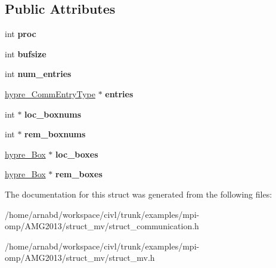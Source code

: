 \subsection*{Public Attributes}
\begin{DoxyCompactItemize}
\item 
\hypertarget{structhypre__CommType__struct_afdc82d23d1051008a87fb58c103ba71b}{}int {\bfseries proc}\label{structhypre__CommType__struct_afdc82d23d1051008a87fb58c103ba71b}

\item 
\hypertarget{structhypre__CommType__struct_a861196212b6c58c29f6d6f4698cb4307}{}int {\bfseries bufsize}\label{structhypre__CommType__struct_a861196212b6c58c29f6d6f4698cb4307}

\item 
\hypertarget{structhypre__CommType__struct_a4b16b6d60f50e7b8cc4e13e408817066}{}int {\bfseries num\+\_\+entries}\label{structhypre__CommType__struct_a4b16b6d60f50e7b8cc4e13e408817066}

\item 
\hypertarget{structhypre__CommType__struct_a0c63140c8f8e06f286b87d7103e606bd}{}\hyperlink{structhypre__CommEntryType__struct}{hypre\+\_\+\+Comm\+Entry\+Type} $\ast$ {\bfseries entries}\label{structhypre__CommType__struct_a0c63140c8f8e06f286b87d7103e606bd}

\item 
\hypertarget{structhypre__CommType__struct_a3bd55bd73f4481ab3d7a4941df0efaf9}{}int $\ast$ {\bfseries loc\+\_\+boxnums}\label{structhypre__CommType__struct_a3bd55bd73f4481ab3d7a4941df0efaf9}

\item 
\hypertarget{structhypre__CommType__struct_aaacbcf897f18fced423c429ff10ca0d4}{}int $\ast$ {\bfseries rem\+\_\+boxnums}\label{structhypre__CommType__struct_aaacbcf897f18fced423c429ff10ca0d4}

\item 
\hypertarget{structhypre__CommType__struct_a2e78a1becf4d42d915aabb4a757c03e5}{}\hyperlink{structhypre__Box__struct}{hypre\+\_\+\+Box} $\ast$ {\bfseries loc\+\_\+boxes}\label{structhypre__CommType__struct_a2e78a1becf4d42d915aabb4a757c03e5}

\item 
\hypertarget{structhypre__CommType__struct_afd922d7b0978d517963c0a5a05f4242b}{}\hyperlink{structhypre__Box__struct}{hypre\+\_\+\+Box} $\ast$ {\bfseries rem\+\_\+boxes}\label{structhypre__CommType__struct_afd922d7b0978d517963c0a5a05f4242b}

\end{DoxyCompactItemize}


The documentation for this struct was generated from the following files\+:\begin{DoxyCompactItemize}
\item 
/home/arnabd/workspace/civl/trunk/examples/mpi-\/omp/\+A\+M\+G2013/struct\+\_\+mv/struct\+\_\+communication.\+h\item 
/home/arnabd/workspace/civl/trunk/examples/mpi-\/omp/\+A\+M\+G2013/struct\+\_\+mv/struct\+\_\+mv.\+h\end{DoxyCompactItemize}
